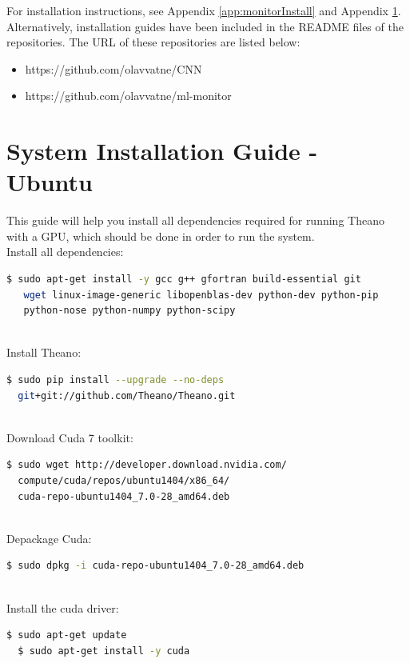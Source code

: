 For installation instructions, see Appendix \ref{app:monitorInstall} and Appendix \ref{app:ubuntuInstall}. Alternatively, installation guides have been included in the README files of the repositories. The URL of these repositories are listed below:

\begin{itemize}
\item https://github.com/olavvatne/CNN
\item https://github.com/olavvatne/ml-monitor
\end{itemize} 


\section{System Installation Guide - Ubuntu}
\label{app:ubuntuInstall}
This guide will help you install all dependencies required for running Theano with a GPU, which should be done in order to run the system. \\
\noindent Install all dependencies:
\begin{lstlisting}[language=bash]
  $ sudo apt-get install -y gcc g++ gfortran build-essential git
   wget linux-image-generic libopenblas-dev python-dev python-pip 
   python-nose python-numpy python-scipy  
\end{lstlisting}
~\\

\noindent Install Theano:
\begin{lstlisting}[language=bash]
  $ sudo pip install --upgrade --no-deps 
  git+git://github.com/Theano/Theano.git
\end{lstlisting}
~\\

\noindent Download Cuda 7 toolkit:
\begin{lstlisting}[language=bash]
  $ sudo wget http://developer.download.nvidia.com/
  compute/cuda/repos/ubuntu1404/x86_64/
  cuda-repo-ubuntu1404_7.0-28_amd64.deb
\end{lstlisting}
~\\

\noindent Depackage Cuda:
\begin{lstlisting}[language=bash]
  $ sudo dpkg -i cuda-repo-ubuntu1404_7.0-28_amd64.deb  
\end{lstlisting}
~\\

\noindent Install the cuda driver:
\begin{lstlisting}[language=bash]
  $ sudo apt-get update
  $ sudo apt-get install -y cuda  
\end{lstlisting}
~\\

